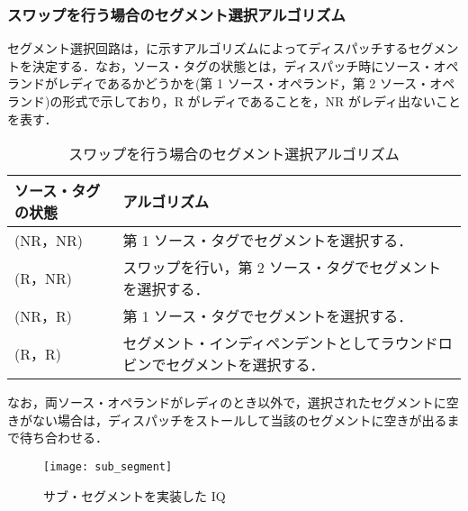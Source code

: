 \subsubsection{スワップを行う場合のセグメント選択アルゴリズム}
セグメント選択回路は，に示すアルゴリズムによってディスパッチするセグメントを決定する．なお，ソース・タグの状態とは，ディスパッチ時にソース・オペランドがレディであるかどうかを(第 1 ソース・オペランド，第 2 ソース・オペランド)の形式で示しており，R がレディであることを，NR がレディ出ないことを表す．

\begin{table}[htb]
  \caption{スワップを行う場合のセグメント選択アルゴリズム}
  \footnotesize
  \center
   \begin{tabular}{|l|l|} \hline \hline
    ソース・タグの状態 & アルゴリズム \\ \hline
    (NR，NR) & 第 1 ソース・タグでセグメントを選択する． \\ \hline
    (R，NR) & スワップを行い，第 2 ソース・タグでセグメントを選択する．\\ \hline
    (NR，R) & 第 1 ソース・タグでセグメントを選択する．\\ \hline
    (R，R) & セグメント・インディペンデントとしてラウンドロビンでセグメントを選択する． \\ \hline
  \end{tabular}
  \label{tab:agg_algorithm}
\end{table}
なお，両ソース・オペランドがレディのとき以外で，選択されたセグメントに空きがない場合は，ディスパッチをストールして当該のセグメントに空きが出るまで待ち合わせる．


\begin{figure}[htb]
  \centering
  \texttt{[image: sub\_segment]}
  \caption{サブ・セグメントを実装した IQ}
  \label{fig:sub_segment}
\end{figure}

